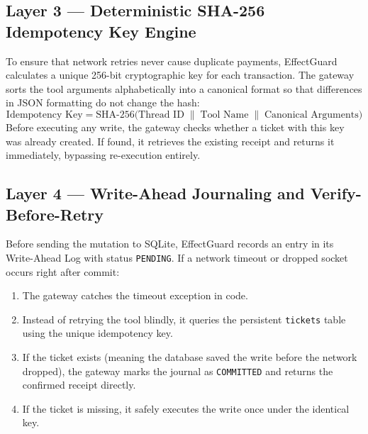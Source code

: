 \subsection{Layer 3 --- Deterministic SHA-256 Idempotency Key Engine}
To ensure that network retries never cause duplicate payments, EffectGuard calculates a unique 256-bit cryptographic key for each transaction. The gateway sorts the tool arguments alphabetically into a canonical format so that differences in JSON formatting do not change the hash:
\begin{equation}
    \text{Idempotency Key} = \text{SHA-256}\Big(\text{Thread ID} \;\|\; \text{Tool Name} \;\|\; \text{Canonical Arguments}\Big)
\end{equation}
Before executing any write, the gateway checks whether a ticket with this key was already created. If found, it retrieves the existing receipt and returns it immediately, bypassing re-execution entirely.

\subsection{Layer 4 --- Write-Ahead Journaling and Verify-Before-Retry}
Before sending the mutation to SQLite, EffectGuard records an entry in its Write-Ahead Log with status \texttt{PENDING}. If a network timeout or dropped socket occurs right after commit:
\begin{enumerate}
    \item The gateway catches the timeout exception in code.
    \item Instead of retrying the tool blindly, it queries the persistent \texttt{tickets} table using the unique idempotency key.
    \item If the ticket exists (meaning the database saved the write before the network dropped), the gateway marks the journal as \texttt{COMMITTED} and returns the confirmed receipt directly.
    \item If the ticket is missing, it safely executes the write once under the identical key.
\end{enumerate}

